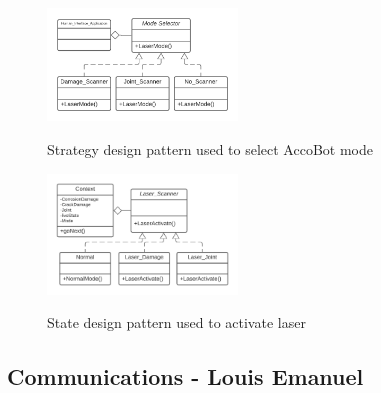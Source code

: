 \documentclass[11pt]{article}		%
\begin{document}
        	\begin{figure}[h]
				\centering
					\begin{multicols}{2}
					\includegraphics[width=0.45\textwidth]{Strategy_3YP_UML}
					\caption{Strategy design pattern used to select AccoBot mode}
					\label{Strategy}
			    	\columnbreak
					\includegraphics[width=0.45\textwidth]{State}
					\caption{State design pattern used to activate laser}
					\label{State}
					\end{multicols}
			\end{figure}	
			
		\subsection[Communications]{Communications - Louis Emanuel}
		    
\end{document}
